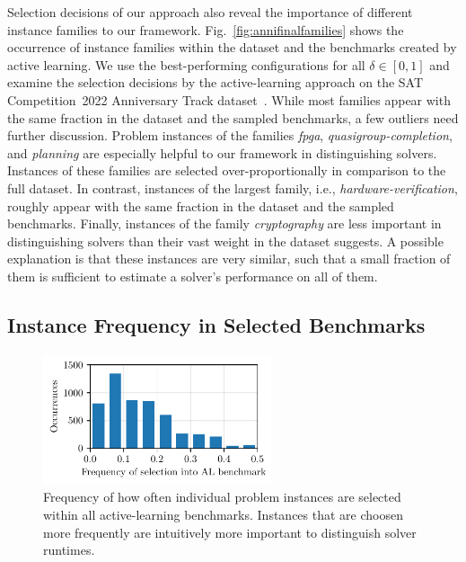 \documentclass[runningheads]{llncs}
\begin{document}
Selection decisions of our approach also reveal the importance of different instance families to our framework.
Fig.~\ref{fig:annifinalfamilies} shows the occurrence of instance families within the dataset and the benchmarks created by active learning.
We use the best-performing configurations for all $\delta \in \left[0, 1\right]$ and examine the selection decisions by the active-learning approach on the SAT Competition~2022 Anniversary Track dataset~\cite{sat2022}.
While most families appear with the same fraction in the dataset and the sampled benchmarks, a few outliers need further discussion.
Problem instances of the families \emph{fpga}, \emph{quasigroup-completion}, and \emph{planning} are especially helpful to our framework in distinguishing solvers.
Instances of these families are selected over-proportionally in comparison to the full dataset.
In contrast, instances of the largest family, i.e., \emph{hardware-verification}, roughly appear with the same fraction in the dataset and the sampled benchmarks.
Finally, instances of the family \emph{cryptography} are less important in distinguishing solvers than their vast weight in the dataset suggests.
A possible explanation is that these instances are very similar, such that a small fraction of them is sufficient to estimate a solver's performance on all of them.

\subsection{Instance Frequency in Selected Benchmarks}
\begin{figure}
  \centering
  \includegraphics[width=0.6\textwidth]{../plots/instoccs.pdf}
  \caption{Frequency of how often individual problem instances are selected within all active-learning benchmarks. Instances that are choosen more frequently are intuitively more important to distinguish solver runtimes.}
\end{figure}

\end{document}
